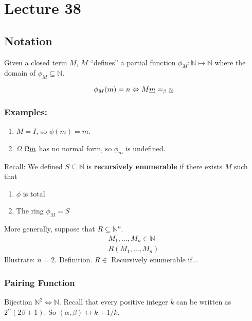 \chapter{Lecture 38}
\pagestyle{fancy}

\section{Notation}
Given a closed term $M$, $M$ ``defines'' a partial function $\phi_M : \mathbb{N} \mapsto \mathbb{N}$ where the domain of $\phi_M \subseteq \mathbb{N}$.

\begin{equation*}
  \phi_M(m) = n \Leftrightarrow M\uline{m} =_\beta \uline{n}
\end{equation*}

\subsection{Examples:}
\begin{enumerate}[(1)]
  \item $M = I$, so $\phi(m) = m$.
  \item $\Omega$ $\Omega\uline{m}$ has no normal form, so $\phi_m$ is undefined.
\end{enumerate}
Recall: We defined $S \subseteq \mathbb{N}$ is \textbf{recursively enumerable} if there exists $M$ such that
\begin{enumerate}
  \item $\phi$ is total
  \item The ring $\phi_M = S$
\end{enumerate}

More generally, suppose that $R \subseteq \mathbb{N}^n$.
\begin{eqnarray*}
  M_1,\ldots,M_n \in \mathbb{N}\\
  R(M_1,\ldots,M_n)
\end{eqnarray*}
Illustrate: $n = 2$. Definition. $R \in$ Recursively enumerable if...

\subsection{Pairing Function}
Bijection $\mathbb{N}^2 \Leftrightarrow \mathbb{N}$. Recall that every positive integer $k$ can be written as $2^\alpha(2\beta + 1)$. So $(\alpha,\beta) \leftrightarrow k+1 / k$.

